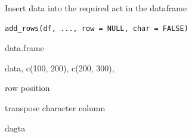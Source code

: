 \documentclass[a4paper]{book}
\begin{document}
%
\begin{Description}
Insert data into the required act in the dataframe
\end{Description}
%
\begin{Usage}
\begin{verbatim}
add_rows(df, ..., row = NULL, char = FALSE)
\end{verbatim}
\end{Usage}
%
\begin{Arguments}
\begin{ldescription}
\item[\code{df}] data.frame

\item[\code{...}] data,  c(100, 200), c(200, 300),

\item[\code{row}] row position

\item[\code{char}] transpose character column
\end{ldescription}
\end{Arguments}
%
\begin{Value}
dagta
\end{Value}
%
\end{document}
